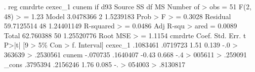 . reg cmrdrte cexec_1 cunem if d93
{\smallskip}
      Source {\VBAR}       SS           df       MS      Number of
>  obs   =        51
   F(2, 48) 
>        =      1.23
       Model {\VBAR}   3.0478366         2   1.5239183   Prob > F 
>        =    0.3028
    Residual {\VBAR}  59.7125514        48  1.24401149   R-squared
>        =    0.0486
   Adj R-squ
> ared   =    0.0089
       Total {\VBAR}   62.760388        50  1.25520776   Root MSE 
>        =    1.1154
{\smallskip}
     cmrdrte {\VBAR}      Coef.   Std. Err.      t    P>|t|     [9
> 5\% Con                                                    
>       f. Interval]
     cexec_1 {\VBAR}   .1083461   .0719723     1.51   0.139    -.0
> 363639                                                    
>           .2530561
       cunem {\VBAR}   -.070735   .1640407    -0.43   0.668    -.4
> 005611                                                    
>            .259091
       _cons {\VBAR}   .3795394   .2156246     1.76   0.085     -.
> 054003                                                    
>           .8130817
{\smallskip}
